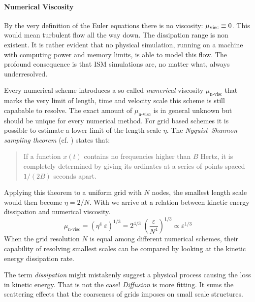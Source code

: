 \paragraph{Numerical Viscosity} By the very definition of the Euler equations
there is no viscosity: $\mu_{\text{visc}} \equiv 0$. This would mean turbulent flow all the
way down. The dissipation range is non existent. It is rather evident that no
physical
simulation, running on a machine with computing power and memory limits, is
able to model this flow. The profound consequence is that ISM simulations are,
no matter what, always underresolved.

Every numerical scheme introduces a so called \emph{numerical} viscosity
$\mu_{\text{n-visc}}$ that marks the very limit of length, time and velocity
scale this scheme is still capabable to resolve. The exact amount of
$\mu_{\text{n-visc}}$ is in general unknown but should be unique for every
numerical method. For grid based schemes it is possible to estimate a 
lower limit of the length scale $\eta$. The \emph{Nyquist–Shannon sampling
theorem} (cf. \cite{shannon1949communication}) states that:
\begin{quote}
If a function $x(t)$ contains no frequencies higher than $B$ Hertz, it is
completely determined by giving its ordinates at a series of points spaced
$1/(2B)$ seconds apart.
\end{quote}
Applying this theorem to a uniform grid with $N$ nodes, the smallest length
scale would then become $\eta = 2/N$. With  we arrive at
a relation between kinetic energy dissipation and numerical viscosity.
\begin{equation}
\label{eqn:relation-ekin-diss-numerical-visc}
    \mu_{\text{n-visc}} = (\eta^4 \; \varepsilon)^{1/3} 
        = 2^{4/3}\;\left(\frac{\varepsilon}{N^4}\right)^{1/3}
        \propto \varepsilon^{1/3}
\end{equation}
When the grid resolution $N$ is equal among different numerical schemes,
their capability of resolving smallest scales can be compared by looking at the
kinetic energy dissipation rate.

\remark The term \emph{dissipation} might mistakenly suggest a physical process
causing the loss in kinetic energy. That is not the case! \emph{Diffusion} is
more fitting. It sums the scattering effects that the coarseness of grids
imposes on small scale structures.


